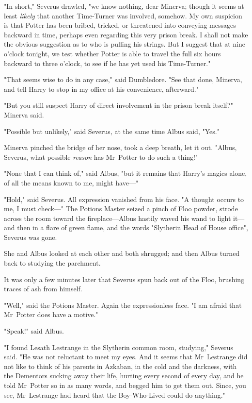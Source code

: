 "In short," Severus drawled, "we know nothing, dear Minerva; though it seems at
least \emph{likely} that another Time-Turner was involved, somehow. My own
suspicion is that Potter has been bribed, tricked, or threatened into conveying
messages backward in time, perhaps even regarding this very prison break. I
shall not make the obvious suggestion as to who is pulling his strings. But I
suggest that at nine o'clock tonight, we test whether Potter is able to travel
the full six hours backward to three o'clock, to see if he has yet used his
Time-Turner."

"That seems wise to do in any case," said Dumbledore. "See that done, Minerva,
and tell Harry to stop in my office at his convenience, afterward."

"But you still suspect Harry of direct involvement in the prison break itself?"
Minerva said.

"Possible but unlikely," said Severus, at the same time Albus said, "Yes."

Minerva pinched the bridge of her nose, took a deep breath, let it out. "Albus,
Severus, what possible \emph{reason} has Mr~Potter to do such a thing!"

"None that I can think of," said Albus, "but it remains that Harry's magics
alone, of all the means known to me, might have---"

"Hold," said Severus. All expression vanished from his face. "A thought occurs
to me, I must check---" The Potions Master seized a pinch of Floo powder,
strode across the room toward the fireplace---Albus hastily waved his wand to
light it---and then in a flare of green flame, and the words "Slytherin Head of
House office", Severus was gone.

She and Albus looked at each other and both shrugged; and then Albus turned
back to studying the parchment.

It was only a few minutes later that Severus spun back out of the Floo,
brushing traces of ash from himself.

"Well," said the Potions Master. Again the expressionless face. "I am afraid
that Mr~Potter does have a motive."

"Speak!" said Albus.

"I found Lesath Lestrange in the Slytherin common room, studying," Severus
said. "He was not reluctant to meet my eyes. And it seems that Mr~Lestrange
did not like to think of his parents in Azkaban, in the cold and the darkness,
with the Dementors sucking away their life, hurting every second of every day,
and he told Mr~Potter so in as many words, and begged him to get them out.
Since, you see, Mr~Lestrange had heard that the Boy-Who-Lived could do
anything."

